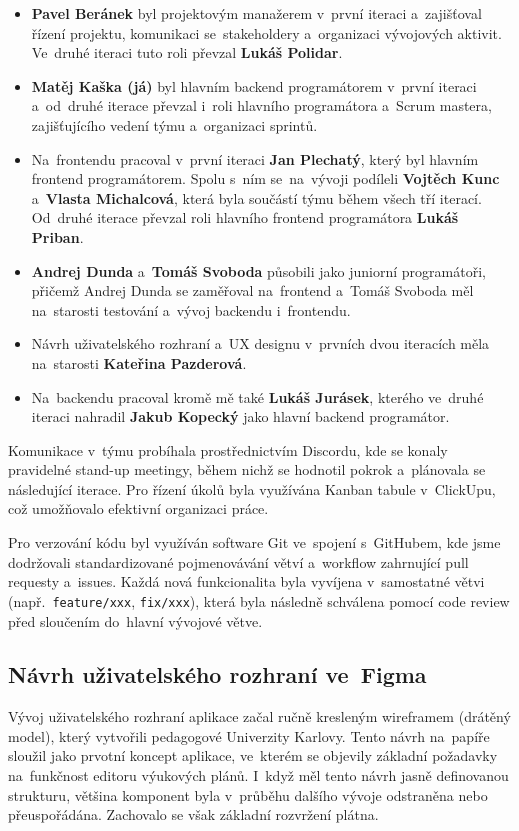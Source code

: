 \documentclass[male,czech,api_bc]{kitheses}
\begin{document}
\begin{itemize}
	\item \textbf{Pavel Beránek} byl projektovým manažerem v~první iteraci a~zajišťoval řízení projektu, komunikaci se~stakeholdery a~organizaci vývojových aktivit. Ve~druhé iteraci tuto roli převzal \textbf{Lukáš Polidar}.
	\item \textbf{Matěj Kaška (já)} byl hlavním backend programátorem v~první iteraci a~od~druhé iterace převzal i~roli hlavního programátora a~Scrum mastera, zajišťujícího vedení týmu a~organizaci sprintů.
	\item Na~frontendu pracoval v~první iteraci \textbf{Jan Plechatý}, který byl hlavním frontend programátorem. Spolu s~ním se~na~vývoji podíleli \textbf{Vojtěch Kunc} a~\textbf{Vlasta Michalcová}, která byla součástí týmu během všech tří iterací. Od~druhé iterace převzal roli hlavního frontend programátora \textbf{Lukáš Priban}.
	\item \textbf{Andrej Dunda} a~\textbf{Tomáš Svoboda} působili jako juniorní programátoři, přičemž Andrej Dunda se zaměřoval na~frontend a~Tomáš Svoboda měl na~starosti testování a~vývoj backendu i~frontendu.
	\item Návrh uživatelského rozhraní a~UX designu v~prvních dvou iteracích měla na~starosti \textbf{Kateřina Pazderová}.
	\item Na~backendu pracoval kromě mě také \textbf{Lukáš Jurásek}, kterého ve~druhé iteraci nahradil \textbf{Jakub Kopecký} jako hlavní backend programátor.
\end{itemize}

Komunikace v~týmu probíhala prostřednictvím Discordu, kde se konaly pravidelné stand-up meetingy, během nichž se hodnotil pokrok a~plánovala se následující iterace. Pro řízení úkolů byla využívána Kanban tabule v~ClickUpu, což umožňovalo efektivní organizaci práce.

Pro verzování kódu byl využíván software Git ve~spojení s~GitHubem, kde jsme dodržovali standardizované pojmenovávání větví a~workflow zahrnující pull requesty a~issues. Každá nová funkcionalita byla vyvíjena v~samostatné větvi (např.~\texttt{feature/xxx}, \texttt{fix/xxx}), která byla následně schválena pomocí code review před sloučením do~hlavní vývojové větve.

\subsection{Návrh uživatelského rozhraní ve~Figma}

Vývoj uživatelského rozhraní aplikace začal ručně kresleným wireframem (drátěný model), který vytvořili pedagogové Univerzity Karlovy. Tento návrh na~papíře sloužil jako prvotní koncept aplikace, ve~kterém se objevily základní požadavky na~funkčnost editoru výukových plánů. I~když měl tento návrh jasně definovanou strukturu, většina komponent byla v~průběhu dalšího vývoje odstraněna nebo přeuspořádána. Zachovalo se však základní rozvržení plátna.
\end{document}
